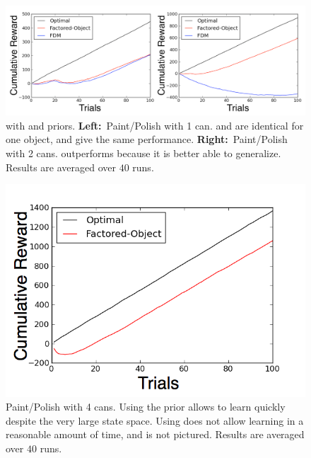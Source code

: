 \begin{figure}
\vskip 0.2in
\begin{center}
\centerline{\includegraphics[width=.9\linewidth]{figures/paint1-2can}}
\caption{
 with  and  priors. {\bf Left:}~Paint/Polish with 1 can.  and  are identical for one object, and give the same performance. {\bf Right:}~Paint/Polish with 2 cans.  outperforms  because it is better able to generalize. Results are averaged over $40$ runs.
}
\label{fig:paint1-2can}
\end{center}
\vskip -0.2in
\end{figure} 


\begin{figure}
\vskip 0.2in
\begin{center}
\centerline{\includegraphics[width=.9\linewidth]{figures/paint4can}}
\caption{
Paint/Polish with 4 cans. Using the  prior allows  to learn quickly despite the very large state space. Using  does not allow learning in a reasonable amount of time, and is not pictured. Results are averaged over $40$ runs.
}
\label{fig:paint4can}
\end{center}
\vskip -0.2in
\end{figure} 


